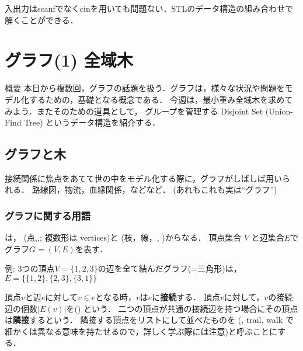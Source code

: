 入出力はscanfでなくcinを用いても問題ない．STLのデータ構造の組み合わせで解くことができる．

\chapter{グラフ(1) 全域木}

\begin{itembox}[l]{概要}
本日から複数回，グラフの話題を扱う．グラフは，様々な状況や問題をモデル化するための，基礎となる概念である．
今週は，最小重み全域木を求めてみよう．またそのための道具として，
グループを管理する Disjoint Set (Union-Find Tree) というデータ構造を紹介する．
\end{itembox}

\section{グラフと木}

接続関係に焦点をあてて世の中をモデル化する際に，グラフがしばしば用いら
れる．
路線図，物流，血縁関係，などなど．
(\pccbook[2-5節, p.~87] あれもこれも実は``グラフ'')

\begin{center}
\end{center}


\subsection{グラフに関する用語}

は， (点,,; 複数形は vertices)と
(枝，線，, )からなる．
頂点集合 $V$ と辺集合$E$でグラフ$G=(V,E)$を表す．

例: 3つの頂点$V=\{1,2,3\}$の辺を全て結んだグラフ(=三角形)は，
$E=\{\{1,2\},\{2,3\}, \{3,1\}\}$

頂点$v$と辺$e$に対して$v\in e$となる時，$v$は$e$に\textbf{接続}する．
頂点$v$に対して，$v$の接続辺の個数$|E(v)|$を() という．
二つの頂点が共通の接続辺を持つ場合にその頂点は\textbf{隣接}するという．
隣接する頂点をリストにして並べたものを (, trail, walk
で細かくは異なる意味を持たせるので，詳しく学ぶ際には注意)と呼ぶことにする．

